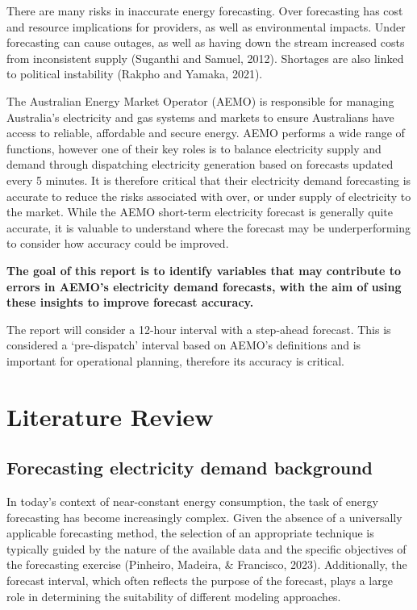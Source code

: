 \documentclass[mstat,12pt]{unswthesis}
\begin{document}
There are many risks in inaccurate energy forecasting. Over forecasting has cost and resource implications for providers, as well as environmental impacts. Under forecasting can cause outages, as well as having down the stream increased costs from inconsistent supply (Suganthi and Samuel, 2012). Shortages are also linked to political instability (Rakpho and Yamaka, 2021).

\bigskip

The Australian Energy Market Operator (AEMO) is responsible for managing Australia's electricity and gas systems and markets to ensure Australians have access to reliable, affordable and secure energy. AEMO performs a wide range of functions, however one of their key roles is to balance electricity supply and demand through dispatching electricity generation based on forecasts updated every 5 minutes. It is therefore critical that their electricity demand forecasting is accurate to reduce the risks associated with over, or under supply of electricity to the market. While the AEMO short-term electricity forecast is generally quite accurate, it is valuable to understand where the forecast may be underperforming to consider how accuracy could be improved.

\bigskip

\textbf{The goal of this report is to identify variables that may contribute to errors in AEMO's electricity demand forecasts, with the aim of using these insights to improve forecast accuracy.}

\bigskip

The report will consider a 12-hour interval with a step-ahead forecast. This is considered a `pre-dispatch' interval based on AEMO's definitions and is important for operational planning, therefore its accuracy is critical.

\clearpage

\chapter{Literature Review}\label{literature-review}

\section{Forecasting electricity demand background}\label{forecasting-electricity-demand-background}

In today's context of near-constant energy consumption, the task of energy forecasting has become increasingly complex. Given the absence of a universally applicable forecasting method, the selection of an appropriate technique is typically guided by the nature of the available data and the specific objectives of the forecasting exercise (Pinheiro, Madeira, \& Francisco, 2023). Additionally, the forecast interval, which often reflects the purpose of the forecast, plays a large role in determining the suitability of different modeling approaches.
\end{document}
